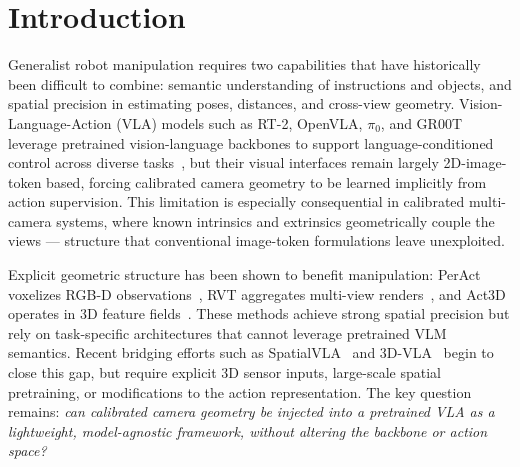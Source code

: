 \documentclass{article}
\begin{document}
{\small {}} 


\section{Introduction}

Generalist robot manipulation requires two capabilities that have historically 
been difficult to combine: semantic understanding of instructions and objects, 
and spatial precision in estimating poses, distances, and cross-view geometry. 
Vision-Language-Action (VLA) models such as RT-2, OpenVLA, $\pi_0$, and GR00T 
leverage pretrained vision-language backbones to support language-conditioned 
control across diverse tasks~\citep{zitkovich2023rt2, kim2024openvla, 
black2025pi0, bjorck2025gr00t}, but their visual interfaces remain largely 
2D-image-token based, forcing calibrated camera geometry to be learned 
implicitly from action supervision. This limitation is especially consequential 
in calibrated multi-camera systems, where known intrinsics and extrinsics 
geometrically couple the views --- structure that conventional image-token 
formulations leave unexploited.


Explicit geometric structure has been shown to benefit manipulation: PerAct 
voxelizes RGB-D observations~\citep{shridhar2023peract}, RVT aggregates 
multi-view renders~\citep{goyal2023rvt}, and Act3D operates in 3D feature 
fields~\citep{gervet2023act3d}. These methods achieve strong spatial precision 
but rely on task-specific architectures that cannot leverage pretrained VLM 
semantics. Recent bridging efforts such as SpatialVLA~\citep{qu2025spatialvla} 
and 3D-VLA~\citep{zhen2024threedvla} begin to close this gap, but require 
explicit 3D sensor inputs, large-scale spatial pretraining, or modifications to 
the action representation. The key question remains: \textit{can calibrated 
camera geometry be injected into a pretrained VLA as a lightweight, 
model-agnostic framework, without altering the backbone or action space?}
\end{document}
